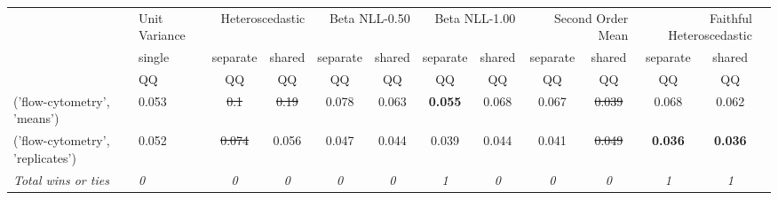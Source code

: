 \begin{tabular}{ll|c|cc|cc|cc|cc|cc}
\toprule
{} & {Unit Variance} & \multicolumn{2}{r}{Heteroscedastic} & \multicolumn{2}{r}{Beta NLL-0.50} & \multicolumn{2}{r}{Beta NLL-1.00} & \multicolumn{2}{r}{Second Order Mean} & \multicolumn{2}{r}{Faithful Heteroscedastic} \\
{} & {single} & {separate} & {shared} & {separate} & {shared} & {separate} & {shared} & {separate} & {shared} & {separate} & {shared} \\
{} & {QQ} & {QQ} & {QQ} & {QQ} & {QQ} & {QQ} & {QQ} & {QQ} & {QQ} & {QQ} & {QQ} \\
\midrule
('flow-cytometry', 'means') & 0.053 & \sout{0.1} & \sout{0.19} & 0.078 & 0.063 & \textbf{0.055} & 0.068 & 0.067 & \sout{0.039} & 0.068 & 0.062 \\
('flow-cytometry', 'replicates') & 0.052 & \sout{0.074} & 0.056 & 0.047 & 0.044 & 0.039 & 0.044 & 0.041 & \sout{0.049} & \textbf{0.036} & \textbf{0.036} \\
\textit{{Total wins or ties}} & \textit{0} & \textit{0} & \textit{0} & \textit{0} & \textit{0} & \textit{1} & \textit{0} & \textit{0} & \textit{0} & \textit{1} & \textit{1} \\
\bottomrule
\end{tabular}
